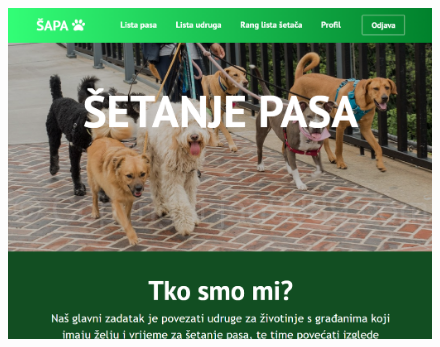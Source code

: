 				\begin{figure}[H]
				
					\includegraphics[scale=0.55]{slike/HomePage.PNG}
					\centering
				\end{figure}
				
